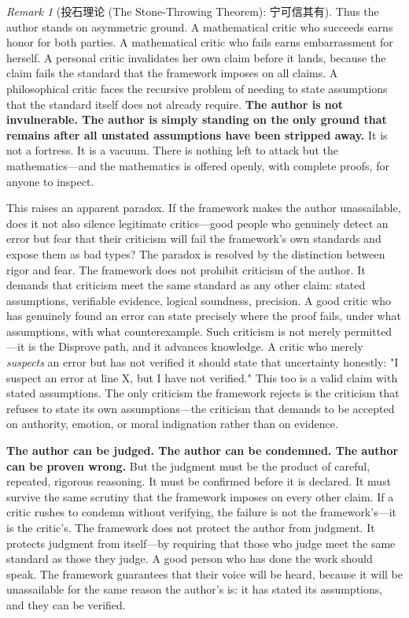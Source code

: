 \documentclass[12pt,a4paper]{ctexart}
\theoremstyle{definition}
\theoremstyle{remark}
\newtheorem{remark}{Remark}[section]
\begin{document}
\begin{remark}[投石理论 (The Stone-Throwing Theorem): 宁可信其有]
Thus the author stands on asymmetric ground. A mathematical critic who succeeds earns honor for both parties. A mathematical critic who fails earns embarrassment for herself. A personal critic invalidates her own claim before it lands, because the claim fails the standard that the framework imposes on all claims. A philosophical critic faces the recursive problem of needing to state assumptions that the standard itself does not already require. \textbf{The author is not invulnerable. The author is simply standing on the only ground that remains after all unstated assumptions have been stripped away.} It is not a fortress. It is a vacuum. There is nothing left to attack but the mathematics—and the mathematics is offered openly, with complete proofs, for anyone to inspect.

This raises an apparent paradox. If the framework makes the author unassailable, does it not also silence legitimate critics—good people who genuinely detect an error but fear that their criticism will fail the framework's own standards and expose them as bad types? The paradox is resolved by the distinction between rigor and fear. The framework does not prohibit criticism of the author. It demands that criticism meet the same standard as any other claim: stated assumptions, verifiable evidence, logical soundness, precision. A good critic who has genuinely found an error can state precisely where the proof fails, under what assumptions, with what counterexample. Such criticism is not merely permitted—it is the Disprove path, and it advances knowledge. A critic who merely \textit{suspects} an error but has not verified it should state that uncertainty honestly: "I suspect an error at line X, but I have not verified." This too is a valid claim with stated assumptions. The only criticism the framework rejects is the criticism that refuses to state its own assumptions—the criticism that demands to be accepted on authority, emotion, or moral indignation rather than on evidence.

\textbf{The author can be judged. The author can be condemned. The author can be proven wrong.} But the judgment must be the product of careful, repeated, rigorous reasoning. It must be confirmed before it is declared. It must survive the same scrutiny that the framework imposes on every other claim. If a critic rushes to condemn without verifying, the failure is not the framework's—it is the critic's. The framework does not protect the author from judgment. It protects judgment from itself—by requiring that those who judge meet the same standard as those they judge. A good person who has done the work should speak. The framework guarantees that their voice will be heard, because it will be unassailable for the same reason the author's is: it has stated its assumptions, and they can be verified.


\end{remark}
\end{document}
